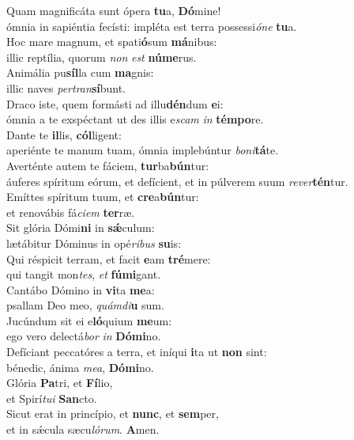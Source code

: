 \oddverse Quam magnificáta sunt ópera \textbf{tu}a, \textbf{Dó}mine!~\*\\
\oddverse ómnia in sapiéntia fecísti: impléta est terra possessi\textit{ó}\textit{ne} \textbf{tu}a.\\
\evenverse Hoc mare magnum, et spati\textbf{ó}sum \textbf{má}nibus:~\*\\
\evenverse illic reptília, quorum \textit{non} \textit{est} \textbf{nú}\textbf{me}rus.\\
\oddverse Animália pu\textbf{síl}la cum \textbf{ma}gnis:~\*\\
\oddverse illic naves \textit{per}\textit{tran}\textbf{sí}bunt.\\
\evenverse Draco iste, quem formásti ad illu\textbf{dén}dum \textbf{e}i:~\*\\
\evenverse ómnia a te exspéctant ut des illis e\textit{scam} \textit{in} \textbf{tém}\textbf{po}re.\\
\oddverse Dante te \textbf{il}lis, \textbf{cól}ligent:~\*\\
\oddverse aperiénte te manum tuam, ómnia implebúntur \textit{bo}\textit{ni}\textbf{tá}te.\\
\evenverse Averténte autem te fáciem, \textbf{tur}ba\textbf{bún}tur:~\*\\
\evenverse áuferes spíritum eórum, et defícient, et in púlverem suum \textit{re}\textit{ver}\textbf{tén}tur.\\
\oddverse Emíttes spíritum tuum, et \textbf{cre}a\textbf{bún}tur:~\*\\
\oddverse et renovábis fá\textit{ci}\textit{em} \textbf{ter}ræ.\\
\evenverse Sit glória Dómi\textbf{ni} in \textbf{sǽ}culum:~\*\\
\evenverse lætábitur Dóminus in opé\textit{ri}\textit{bus} \textbf{su}is:\\
\oddverse Qui réspicit terram, et facit \textbf{e}am \textbf{tré}mere:~\*\\
\oddverse qui tangit mon\textit{tes}, \textit{et} \textbf{fú}\textbf{mi}gant.\\
\evenverse Cantábo Dómino in \textbf{vi}ta \textbf{me}a:~\*\\
\evenverse psallam Deo meo, \textit{quám}\textit{di}\textbf{u} sum.\\
\oddverse Jucúndum sit ei e\textbf{ló}quium \textbf{me}um:~\*\\
\oddverse ego vero delectá\textit{bor} \textit{in} \textbf{Dó}\textbf{mi}no.\\
\evenverse Defíciant peccatóres a terra, et iníqui \textbf{i}ta ut \textbf{non} sint:~\*\\
\evenverse bénedic, ánima \textit{me}\textit{a}, \textbf{Dó}\textbf{mi}no.\\
\oddverse Glória \textbf{Pa}tri, et \textbf{Fí}lio,~\*\\
\oddverse et Spirí\textit{tu}\textit{i} \textbf{San}cto.\\
\evenverse Sicut erat in princípio, et \textbf{nunc}, et \textbf{sem}per,~\*\\
\evenverse et in sǽcula sæcu\textit{ló}\textit{rum}. \textbf{A}men.\\
